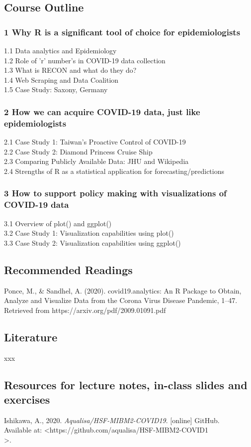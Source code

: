 \documentclass{article}
\begin{document}
\subsection*{Course Outline}
\begin{spacing}{1.0}
\subsubsection*{1 Why R is a significant tool of choice for epidemiologists}
    1.1 Data analytics and Epidemiology \\
    1.2 Role of 'r' number's in COVID-19 data collection \\
    1.3 What is RECON and what do they do? \\
    1.4 Web Scraping and Data Coalition \\
    1.5 Case Study: Saxony, Germany
\subsubsection*{2 How we can acquire COVID-19 data, just like epidemiologists}
    2.1 Case Study 1: Taiwan’s Proactive Control of COVID-19 \\
    2.2 Case Study 2: Diamond Princess Cruise Ship \\
    2.3 Comparing Publicly Available Data: JHU and Wikipedia \\
    2.4 Strengths of R as a statistical application for forecasting/predictions
    \subsubsection*{3 How to support policy making with visualizations of COVID-19 data}
    3.1 Overview of plot() and ggplot() \\
    3.2 Case Study 1: Visualization capabilities using plot() \\
    3.3 Case Study 2: Visualization capabilities using ggplot()
\end{spacing}
\noindent 
\subsection*{Recommended Readings}

Ponce, M., & Sandhel, A. (2020). covid19.analytics: An R Package to Obtain, \indent Analyze and Visualize Data from the Corona Virus Disease Pandemic, 1–47. \indent Retrieved from https://arxiv.org/pdf/2009.01091.pdf

\noindent
\subsection*{Literature}
xxx

\subsection*{Resources for lecture notes, in-class slides and exercises}
Ishikawa, A., 2020. \textit{Aqualisa/HSF-MIBM2-COVID19}. [online] GitHub.  \\
\indent Available at: <https://github.com/aqualisa/HSF-MIBM2-COVID1  \\
>.  \\
\noindent
\end{document}

